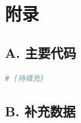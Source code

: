 
\section*{附录}
\label{sec:appendix}

\subsection*{A. 主要代码}
\begin{lstlisting}[language=Python, caption={核心算法代码}]
# (待填充)
\end{lstlisting}

\subsection*{B. 补充数据}

